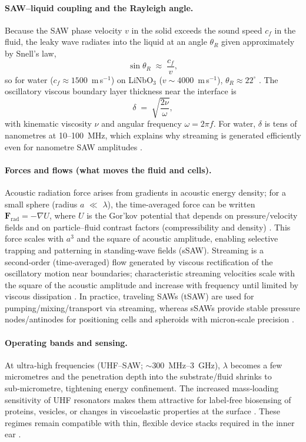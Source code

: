 \documentclass[referee,pdflatex, sn-vancouver-num]{sn-jnl}%
\theoremstyle{thmstyleone}%
\theoremstyle{thmstyletwo}%
\theoremstyle{thmstylethree}%
\begin{document}
\paragraph{SAW–liquid coupling and the Rayleigh angle.}
Because the SAW phase velocity \(v\) in the solid exceeds the sound speed \(c_f\) in the fluid, the leaky wave radiates into the liquid at an angle \(\theta_R\) given approximately by Snell’s law,
\[
\sin \theta_R \;\approx\; \frac{c_f}{v},
\]
so for water (\(c_f\!\approx\!1500\)~m\,s\(^{-1}\)) on LiNbO\(_3\) (\(v\!\sim\!4000\)~m\,s\(^{-1}\)), \(\theta_R\!\approx\!22^{\circ}\) \cite{Friend2011,Ding2013}. The oscillatory viscous boundary layer thickness near the interface is
\[
\delta \;=\; \sqrt{\frac{2\nu}{\omega}},
\]
with kinematic viscosity \(\nu\) and angular frequency \(\omega=2\pi f\). For water, \(\delta\) is tens of nanometres at 10–100~MHz, which explains why streaming is generated efficiently even for nanometre SAW amplitudes \cite{Friend2011,Yeo2014_SAWmicrofluidics}.

\paragraph{Forces and flows (what moves the fluid and cells).}
Acoustic radiation force arises from gradients in acoustic energy density; for a small sphere (radius \(a\) \(\ll\) \(\lambda\)), the time‑averaged force can be written \( \mathbf{F}_{\mathrm{rad}} = -\nabla U \), where \(U\) is the Gor’kov potential that depends on pressure/velocity fields and on particle–fluid contrast factors (compressibility and density) \cite{Friend2011,Gedge2012_SAW}. This force scales with \(a^{3}\) and the square of acoustic amplitude, enabling selective trapping and patterning in standing‑wave fields (sSAW). Streaming is a second‑order (time‑averaged) flow generated by viscous rectification of the oscillatory motion near boundaries; characteristic streaming velocities scale with the square of the acoustic amplitude and increase with frequency until limited by viscous dissipation \cite{Ding2013,Friend2011}. In practice, traveling SAWs (tSAW) are used for pumping/mixing/transport via streaming, whereas sSAWs provide stable pressure nodes/antinodes for positioning cells and spheroids with micron‑scale precision \cite{Gedge2012_SAW,rufo2022}.

\paragraph{Operating bands and sensing.}
At ultra‑high frequencies (UHF–SAW; \(\sim\)300~MHz–3~GHz), \(\lambda\) becomes a few micrometres and the penetration depth into the substrate/fluid shrinks to sub‑micrometre, tightening energy confinement. The increased mass‑loading sensitivity of UHF resonators makes them attractive for label‑free biosensing of proteins, vesicles, or changes in viscoelastic properties at the surface \cite{Agostini2021_UHFSAW}. These regimes remain compatible with thin, flexible device stacks required in the inner ear \cite{Campbell1998}.
\end{document}
